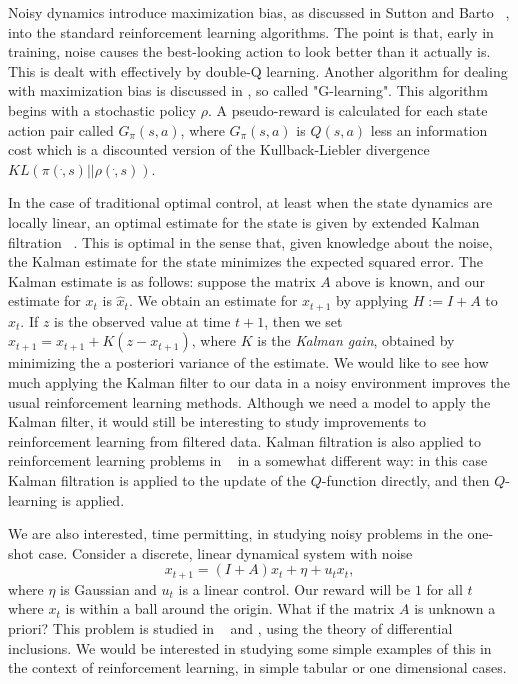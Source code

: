 \documentclass{article}
\begin{document}
Noisy dynamics introduce maximization bias, as discussed in Sutton and Barto ~\cite{suttonAndBarto}, into the standard reinforcement learning algorithms. The point is that, early in training, noise causes the best-looking action to look better than it actually is. This is dealt with effectively by double-Q learning. Another algorithm for dealing with maximization bias is discussed in \cite{foxPakmanTishby}, so called "G-learning". This algorithm begins with a stochastic policy $\rho$. A pseudo-reward is calculated for each state action pair called $G_\pi(s,a)$, where $G_\pi(s,a)$ is $Q(s,a)$ less an information cost which is a discounted version of the Kullback-Liebler divergence $KL(\pi( \dot , s) || \rho( \dot , s))$.

In the case of traditional optimal control, at least when the state dynamics are locally linear, an  optimal estimate for the state is given by extended Kalman filtration ~\cite{welchBishop}. This is optimal in the sense that, given knowledge about the noise, the Kalman estimate for the state minimizes the expected squared error. The Kalman estimate is as follows: suppose the matrix $A$ above is known, and our estimate for $x_t$ is $\hat x_t$. We obtain an estimate for $x_{t+1}$ by applying $H := I+A$ to $\hat x_t$. If $z$ is the observed value at time $t+1$, then we set $\hat x_{t+1} = x_{t+1} + K (z - x_{t+1})$, where $K$ is the {\em Kalman gain}, obtained by minimizing the a posteriori variance of the estimate. We would like to see how much applying the Kalman filter to our data in a noisy environment improves the usual reinforcement learning methods. Although we need a model to apply the Kalman filter, it would still be interesting to study improvements to reinforcement learning from filtered data. Kalman filtration is also applied to reinforcement learning problems in ~\cite{trippSchacter} in a somewhat different way: in this case Kalman filtration is applied to the update of the $Q$-function directly, and then $Q$-learning is applied.

We are also interested, time permitting, in studying noisy problems in the one-shot case. Consider a discrete, linear dynamical system with noise
\[
    x_{t+1} = (I + A) x_t + \eta + u_t x_t,
\]
where $\eta$ is Gaussian and $u_t$ is a linear control. Our reward will be $1$ for all $t$ where $x_t$ is within a ball around the origin. What if the matrix $A$ is unknown a priori? This problem is studied in ~\cite{ornikIsraelTopcu} and \cite{ahmadiIsraelTopcu}, using the theory of differential inclusions. We would be interested in studying some simple examples of this in the context of reinforcement learning, in simple tabular or one dimensional cases. 

{}


 

\end{document}
